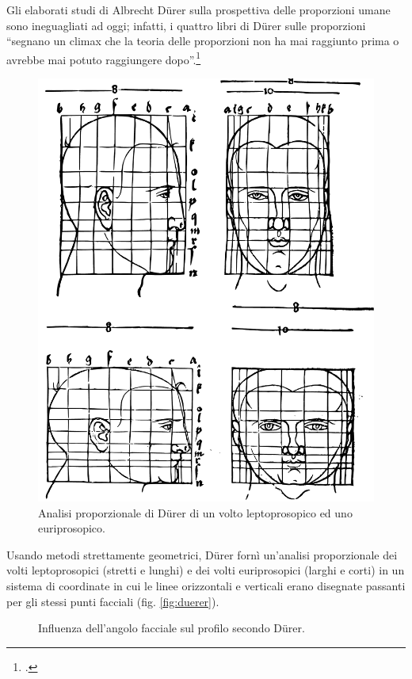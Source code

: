 Gli elaborati studi di Albrecht Dürer sulla prospettiva delle proporzioni umane sono ineguagliati ad oggi; infatti, i quattro libri di Dürer sulle proporzioni ``segnano un climax che la teoria delle proporzioni non ha mai raggiunto prima o avrebbe mai potuto raggiungere dopo''.\footcite{Panofsky1974}

\begin{figure}
\centering
\includegraphics[width=.4\textwidth]{./images/duerer-proportional.pdf}
\caption{Analisi proporzionale di Dürer di un volto leptoprosopico ed uno euriprosopico.}
\label{fig:duerer}
\end{figure}

Usando metodi strettamente geometrici, Dürer fornì un'analisi proporzionale dei volti leptoprosopici (stretti e lunghi) e dei volti euriprosopici (larghi e corti) in un sistema di coordinate in cui le linee orizzontali e verticali erano disegnate passanti per gli stessi punti facciali (fig. \vref{fig:duerer}).

\begin{figure}
\centering
{}
\caption{Influenza dell'angolo facciale sul profilo secondo Dürer.}
\label{fig:duerer2}
\end{figure}

